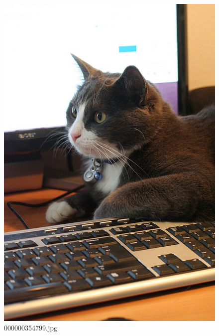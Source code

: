     \begin{figure}[h]
        \centering
        \includegraphics[width=0.8\linewidth]{../image set/easy/000000354799.jpg}
        \caption{000000354799.jpg}
    \end{figure}
